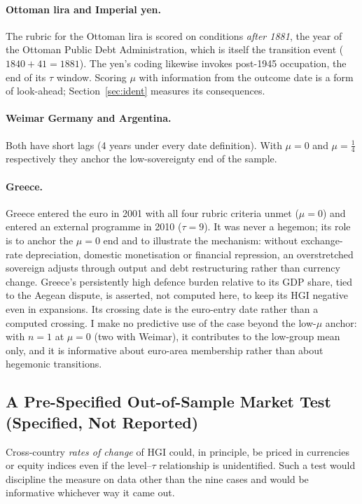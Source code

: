 \documentclass[11pt,letterpaper]{article}
\theoremstyle{definition}
\theoremstyle{plain}
\begin{document}
\paragraph{Ottoman lira and Imperial yen.} The rubric for the Ottoman lira is scored on conditions \emph{after 1881}, the year of the Ottoman Public Debt Administration, which is itself the transition event ($1840+41=1881$). The yen's coding likewise invokes post-1945 occupation, the end of its $\tau$ window. Scoring $\mu$ with information from the outcome date is a form of look-ahead; Section~\ref{sec:ident} measures its consequences.

\paragraph{Weimar Germany and Argentina.} Both have short lags (4 years under every date definition). With $\mu=0$ and $\mu=\tfrac14$ respectively they anchor the low-sovereignty end of the sample.

\paragraph{Greece.} Greece entered the euro in 2001 with all four rubric criteria unmet ($\mu=0$) and entered an external programme in 2010 ($\tau=9$). It was never a hegemon; its role is to anchor the $\mu=0$ end and to illustrate the mechanism: without exchange-rate depreciation, domestic monetisation or financial repression, an overstretched sovereign adjusts through output and debt restructuring rather than currency change. Greece's persistently high defence burden relative to its GDP share, tied to the Aegean dispute, is asserted, not computed here, to keep its HGI negative even in expansions. Its crossing date is the euro-entry date rather than a computed crossing. I make no predictive use of the case beyond the low-$\mu$ anchor: with $n=1$ at $\mu=0$ (two with Weimar), it contributes to the low-group mean only, and it is informative about euro-area membership rather than about hegemonic transitions.

\subsection{A Pre-Specified Out-of-Sample Market Test (Specified, Not Reported)}\label{sec:market}
Cross-country \emph{rates of change} of HGI could, in principle, be priced in currencies or equity indices even if the level--$\tau$ relationship is unidentified. Such a test would discipline the measure on data other than the nine cases and would be informative whichever way it came out.
\end{document}
